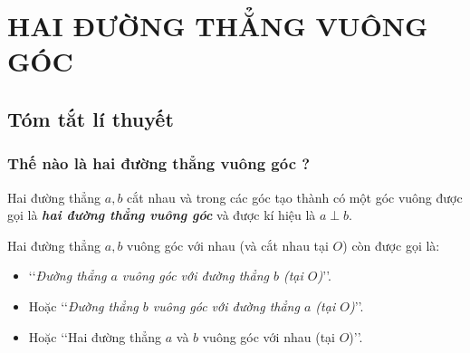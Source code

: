\section{HAI ĐƯỜNG THẲNG VUÔNG GÓC}
\subsection{Tóm tắt lí thuyết}
\subsubsection{Thế nào là hai đường thẳng vuông góc ?}
\begin{dn}
Hai đường thẳng $ a, b $ cắt nhau và trong các góc tạo thành có một góc vuông được gọi là \textbf{\textit{hai đường thẳng vuông góc}} và được kí hiệu là $ a \perp b $.
\end{dn}
\begin{note}
	Hai đường thẳng $ a, b $ vuông góc với nhau (và cắt nhau tại $ O $) còn được gọi là:
	\begin{itemize}
		\item \lq \lq \textit{Đường thẳng $ a $ vuông góc với đường thẳng $ b $ (tại $ O $)}\rq \rq.
		\item Hoặc \lq \lq\textit{Đường thẳng $ b $ vuông góc với đường thẳng $ a $ (tại $ O $)}\rq \rq.
		\item Hoặc \lq \lq Hai đường thẳng $ a $ và $ b $ vuông góc với nhau (tại $ O $)\rq \rq.
	\end{itemize}
\end{note}
